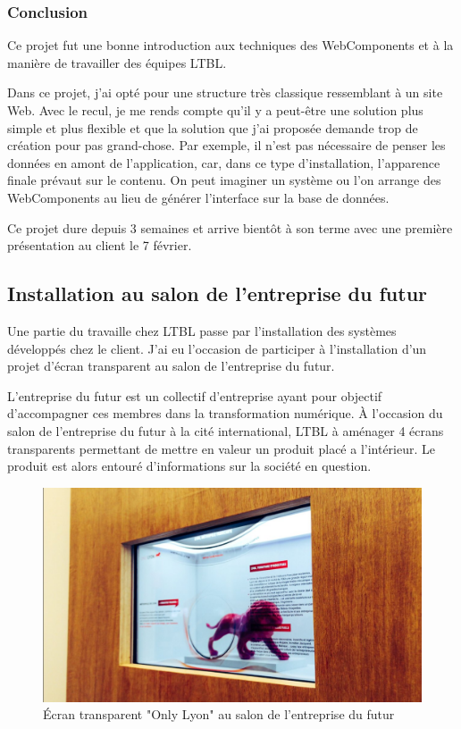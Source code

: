 \documentclass{article}
\begin{document}
\subsubsection{Conclusion}

Ce projet fut une bonne introduction aux techniques des WebComponents et à la manière de travailler des équipes LTBL\@.

Dans ce projet, j'ai opté pour une structure très classique ressemblant à un site Web.
Avec le recul, je me rends compte qu'il y a peut-être une solution plus simple et plus flexible et que la solution que j'ai proposée demande trop de création pour pas grand-chose.
Par exemple, il n'est pas nécessaire de penser les données en amont de l'application, car, dans ce type d'installation, l'apparence finale prévaut sur le contenu.
On peut imaginer un système ou l'on arrange des WebComponents au lieu de générer l'interface sur la base de données.

Ce projet dure depuis 3 semaines et arrive bientôt à son terme avec une première présentation au client le 7 février.

\subsection{Installation au salon de l'entreprise du futur}

Une partie du travaille chez LTBL passe par l'installation des systèmes développés chez le client.
J'ai eu l'occasion de participer à l'installation d'un projet d'écran transparent au salon de l'entreprise du futur.

L'entreprise du futur est un collectif d'entreprise ayant pour objectif d'accompagner ces membres dans la transformation numérique.
À l'occasion du salon de l'entreprise du futur à la cité international, LTBL à aménager 4 écrans transparents permettant de mettre en valeur un produit placé a l'intérieur.
Le produit est alors entouré d'informations sur la société en question.

\begin{figure}[h]
    \centering
    \includegraphics[scale=0.3]{ecran-transparent.jpg}
    \caption{Écran transparent "Only Lyon" au salon de l'entreprise du futur}
\end{figure}
\end{document}
